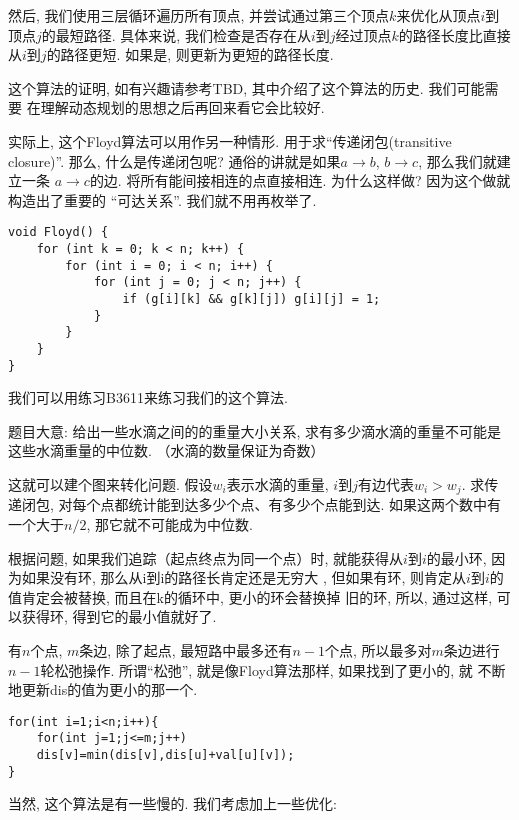 然后, 我们使用三层循环遍历所有顶点, 并尝试通过第三个顶点$k$来优化从顶点$i$到顶点$j$的最短路径. 
具体来说, 我们检查是否存在从$i$到$j$经过顶点$k$的路径长度比直接从$i$到$j$的路径更短. 
如果是, 则更新为更短的路径长度. 

这个算法的证明, 如有兴趣请参考TBD, 其中介绍了这个算法的历史. 我们可能需要
在理解动态规划的思想之后再回来看它会比较好. 

实际上, 这个Floyd算法可以用作另一种情形. 用于求``传递闭包(transitive closure)''. 
那么, 什么是传递闭包呢? 通俗的讲就是如果$a\to b$,  $b\to c$, 那么我们就建立一条
$a\to c$的边. 将所有能间接相连的点直接相连. 为什么这样做? 因为这个做就构造出了重要的
``可达关系''. 我们就不用再枚举了. 

\begin{lstlisting}
void Floyd() {
    for (int k = 0; k < n; k++) {
        for (int i = 0; i < n; i++) {
            for (int j = 0; j < n; j++) {
                if (g[i][k] && g[k][j]) g[i][j] = 1;  
            }
        }
    }
}
\end{lstlisting}

 我们可以用练习B3611来练习我们的这个算法. 

题目大意: 给出一些水滴之间的的重量大小关系, 求有多少滴水滴的重量不可能是这些水滴重量的中位数. （水滴的数量保证为奇数）

这就可以建个图来转化问题. 假设$w_i$表示水滴的重量, $i$到$j$有边代表$w_i>w_j$. 
求传递闭包, 对每个点都统计能到达多少个点、有多少个点能到达. 
如果这两个数中有一个大于$n/2$, 那它就不可能成为中位数. 

 根据问题, 如果我们追踪（起点终点为同一个点）时, 
就能获得从$i$到$i$的最小环, 因为如果没有环, 那么从i到i的路径长肯定还是无穷大
, 但如果有环, 则肯定从$i$到$i$的值肯定会被替换, 而且在k的循环中, 更小的环会替换掉
旧的环, 所以, 通过这样, 可以获得环, 得到它的最小值就好了. 

 有$n$个点, $m$条边, 除了起点, 最短路中最多还有$n-1$个点, 
所以最多对$m$条边进行$n-1$轮松弛操作. 所谓``松弛'', 就是像Floyd算法那样, 如果找到了更小的, 就
不断地更新dis的值为更小的那一个. 
\begin{lstlisting}
for(int i=1;i<n;i++){
    for(int j=1;j<=m;j++)
    dis[v]=min(dis[v],dis[u]+val[u][v]);
}    
\end{lstlisting}

当然, 这个算法是有一些慢的. 我们考虑加上一些优化: 

